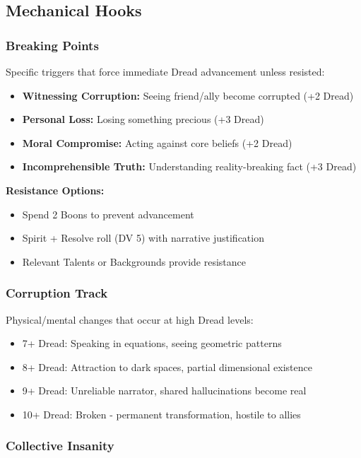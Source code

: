 \documentclass[11pt]{article}
\begin{document}
\subsection{Mechanical Hooks}

\subsubsection{Breaking Points}

Specific triggers that force immediate Dread advancement unless resisted:
\begin{itemize}
\item \textbf{Witnessing Corruption:} Seeing friend/ally become corrupted (+2 Dread)
\item \textbf{Personal Loss:} Losing something precious (+3 Dread)
\item \textbf{Moral Compromise:} Acting against core beliefs (+2 Dread)
\item \textbf{Incomprehensible Truth:} Understanding reality-breaking fact (+3 Dread)
\end{itemize}

\textbf{Resistance Options:}
\begin{itemize}
\item Spend 2 Boons to prevent advancement
\item Spirit + Resolve roll (DV 5) with narrative justification
\item Relevant Talents or Backgrounds provide resistance
\end{itemize}

\subsubsection{Corruption Track}

Physical/mental changes that occur at high Dread levels:
\begin{itemize}
\item 7+ Dread: Speaking in equations, seeing geometric patterns
\item 8+ Dread: Attraction to dark spaces, partial dimensional existence
\item 9+ Dread: Unreliable narrator, shared hallucinations become real
\item 10+ Dread: Broken - permanent transformation, hostile to allies
\end{itemize}

\subsubsection{Collective Insanity}
\end{document}
